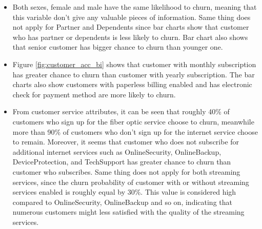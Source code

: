 \begin{itemize}
	\item Both sexes, female and male have the same likelihood to churn, meaning that this variable don't give any valuable pieces of information. Same thing does not apply for Partner and Dependents since bar charts show that customer who has partner or dependents is less likely to churn. Bar chart also shows that senior customer has bigger chance to churn than younger one.
	\item Figure \ref{fig:customer_acc_bi} shows that customer with monthly subscription has greater chance to churn than customer with yearly subscription. The bar charts also show customers with paperless billing enabled and has electronic check for payment method are more likely to churn.
	\item From customer service attributes, it can be seen that roughly 40\% of customers who sign up for the fiber optic service choose to churn, meanwhile more than 90\% of customers who don't sign up for the internet service choose to remain. Moreover, it seems that customer who does not subscribe for additional internet services such as OnlineSecurity, OnlineBackup, DeviceProtection, and TechSupport has greater chance to churn than customer who subscribes. Same thing does not apply for both streaming services, since the churn probability of customer with or without streaming services enabled is roughly equal by 30\%. This value is considered high compared to OnlineSecurity, OnlineBackup and so on, indicating that numerous customers might less satisfied with the quality of the streaming services.
\end{itemize}

